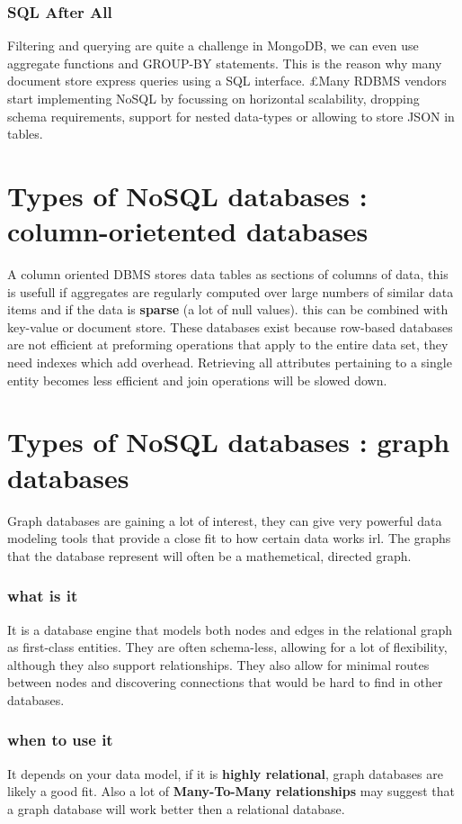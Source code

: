 \documentclass{report}
\begin{document}
			\subsection{SQL After All}
				Filtering and querying are quite a challenge in MongoDB, we can even use aggregate functions and GROUP-BY statements. This is the reason why many document store express queries using a SQL interface. £Many RDBMS vendors start implementing NoSQL by focussing on horizontal scalability, dropping schema requirements, support for nested data-types or allowing to store JSON in tables.
	\chapter{Types of NoSQL databases : column-orietented databases}
		A column oriented DBMS stores data tables as sections of columns of data, this is usefull if aggregates are regularly computed over large numbers of similar data items and if the data is \textbf{sparse} (a lot of null values). this can be combined with key-value or document store.
		These databases exist because row-based databases are not efficient at preforming operations that apply to the entire data set, they need indexes which add overhead. Retrieving all attributes pertaining to a single entity becomes less efficient and join operations will be slowed down.
	\chapter{Types of NoSQL databases : graph databases}
		Graph databases are gaining a lot of interest, they can give very powerful data modeling tools that provide a close fit to how certain data works irl.  The graphs that the database represent will often be a mathemetical, directed graph.
		\subsection{what is it}
			It is a database engine that models both nodes and edges in the relational graph as first-class entities. They are often schema-less, allowing for a lot of flexibility, although they also support relationships. They also allow for minimal routes between nodes and discovering connections that would be hard to find in other databases.
		\subsection{when to use it}
			It depends on your data model, if it is \textbf{highly relational}, graph databases are likely a good fit. Also a lot of\textbf{ Many-To-Many relationships} may suggest that a graph database will work better then a relational database.
\end{document}
